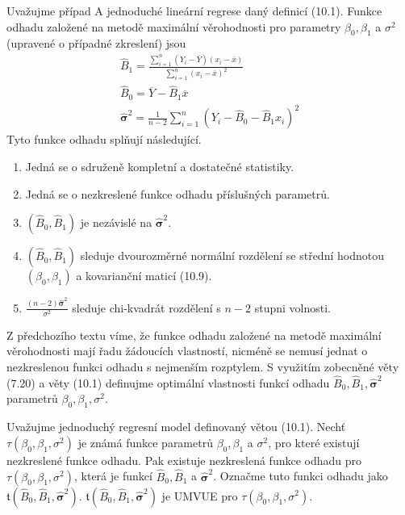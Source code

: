 \begin{theorem}
Uvažujme případ A jednoduché lineární regrese daný definicí (10.1). Funkce odhadu založené na metodě maximální věrohodnosti pro parametry $\beta_0, \beta_1$ a $\sigma^2$ (upravené o případné zkreslení) jsou
\begin{gather*}
\hat{B}_1 = \frac{\sum_{i = 1}^n (Y_i - \overline{Y})(x_i - \overline{x})}{\sum_{i = 1}^n (x_i - \overline{x})^2}\\
\hat{B}_0 = \overline{Y} - \hat{B}_1 \overline{x}\\
\hat{\boldsymbol\sigma}^2 = \frac{1}{n - 2} \sum_{i = 1}^n (Y_i - \hat{B}_0 - \hat{B}_1 x_i)^2
\end{gather*}
Tyto funkce odhadu splňují následující.
\begin{enumerate}
\item Jedná se o sdruženě kompletní a dostatečné statistiky.
\item Jedná se o nezkreslené funkce odhadu příslušných parametrů.
\item $(\hat{B}_0, \hat{B}_1)$ je nezávislé na $\hat{\boldsymbol\sigma}^2$.
\item $(\hat{B}_0, \hat{B}_1)$ sleduje dvourozměrné normální rozdělení se střední hodnotou $(\beta_0, \beta_1)$ a kovarianční maticí (10.9).
\item $\frac{(n - 2)\hat{\boldsymbol\sigma}^2}{\sigma^2}$ sleduje chi-kvadrát rozdělení s $n - 2$ stupni volnosti.
\end{enumerate}
\end{theorem}

Z předchozího textu víme, že funkce odhadu založené na metodě maximální věrohodnosti mají řadu žádoucích vlastností, nicméně se nemusí jednat o nezkreslenou funkci odhadu s nejmenším rozptylem. S využitím zobecněné věty (7.20) a věty (10.1) definujme optimální vlastnosti funkcí odhadu $\hat{B}_0, \hat{B}_1, \hat{\boldsymbol \sigma}^2$ parametrů $\beta_0, \beta_1, \sigma^2$.

\begin{theorem}
Uvažujme jednoduchý regresní model definovaný větou (10.1). Nechť $\tau(\beta_0, \beta_1, \sigma^2)$ je známá funkce parametrů $\beta_0, \beta_1$ a $\sigma^2$, pro které existují nezkreslené funkce odhadu. Pak existuje nezkreslená funkce odhadu pro $\tau(\beta_0, \beta_1, \sigma^2)$, která je funkcí $\hat{B}_0, \hat{B}_1$ a $\hat{\boldsymbol \sigma}^2$. Označme tuto funkci odhadu jako $\mathfrak{t}(\hat{B}_0, \hat{B}_1, \hat{\boldsymbol \sigma}^2)$. $\mathfrak{t}(\hat{B}_0, \hat{B}_1, \hat{\boldsymbol \sigma}^2)$ je UMVUE pro  $\tau(\beta_0, \beta_1, \sigma^2)$.
\end{theorem}

